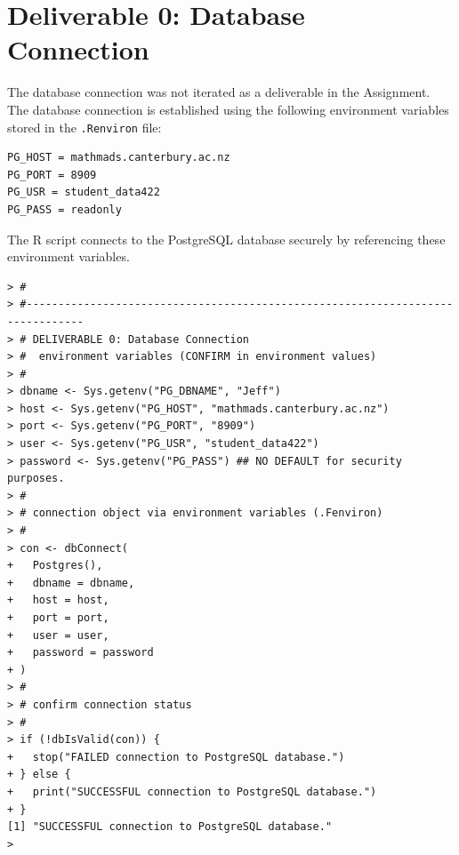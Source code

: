\documentclass[a4paper,11pt]{extarticle}
\begin{document}
\section*{Deliverable 0: Database Connection}
The database connection was not iterated as a deliverable in the Assignment. The database connection is established using the following environment variables stored in the \texttt{.Renviron} file:
\begin{verbatim}
PG_HOST = mathmads.canterbury.ac.nz
PG_PORT = 8909
PG_USR = student_data422
PG_PASS = readonly
\end{verbatim}
The R script connects to the PostgreSQL database securely by referencing these environment variables.
\begin{verbatim}
> #
> #-------------------------------------------------------------------------------
> # DELIVERABLE 0: Database Connection
> #  environment variables (CONFIRM in environment values)
> #
> dbname <- Sys.getenv("PG_DBNAME", "Jeff")
> host <- Sys.getenv("PG_HOST", "mathmads.canterbury.ac.nz")
> port <- Sys.getenv("PG_PORT", "8909")
> user <- Sys.getenv("PG_USR", "student_data422")
> password <- Sys.getenv("PG_PASS") ## NO DEFAULT for security purposes. 
> #
> # connection object via environment variables (.Fenviron)
> #
> con <- dbConnect(
+   Postgres(),
+   dbname = dbname,
+   host = host,
+   port = port,
+   user = user,
+   password = password
+ )
> #
> # confirm connection status
> #
> if (!dbIsValid(con)) {
+   stop("FAILED connection to PostgreSQL database.")
+ } else {
+   print("SUCCESSFUL connection to PostgreSQL database.")
+ }
[1] "SUCCESSFUL connection to PostgreSQL database."
> 
\end{verbatim}
\newpage
\end{document}
